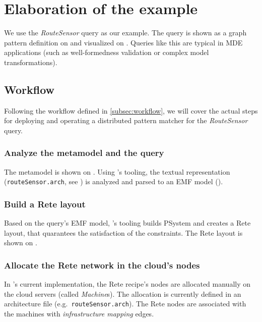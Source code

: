 \section{Elaboration of the example}
\label{sec:elaboration}

We use the \textit{RouteSensor} query as our example. The query is shown as a graph pattern definition on  and visualized on . Queries like this are typical in MDE applications (such as well-formedness validation or complex model transformations).

\subsection{Workflow}

Following the workflow defined in \autoref{subsec:workflow}, we will cover the actual steps for deploying and operating a distributed pattern matcher for the \textit{RouteSensor} query.

\subsubsection{Analyze the metamodel and the query}

The metamodel is shown on . Using \eiq{}'s tooling, the textual representation (\texttt{routeSensor.arch}, see ) is analyzed and parsed to an EMF model ().


\subsubsection{Build a Rete layout}

Based on the query's EMF model, \eiq{}'s tooling builds PSystem and creates a Rete layout, that quarantees the satisfaction of the constraints. The Rete layout is shown on . 

\subsubsection{Allocate the Rete network in the cloud's nodes} 

In \iqd{}'s current implementation, the Rete recipe's nodes are allocated manually on the cloud servers (called \textit{Machine}s). The allocation is currently defined in an architecture file (e.g.\ \texttt{routeSensor.arch}). The Rete nodes are associated with the machines with \textit{infrastructure mapping} edges.

